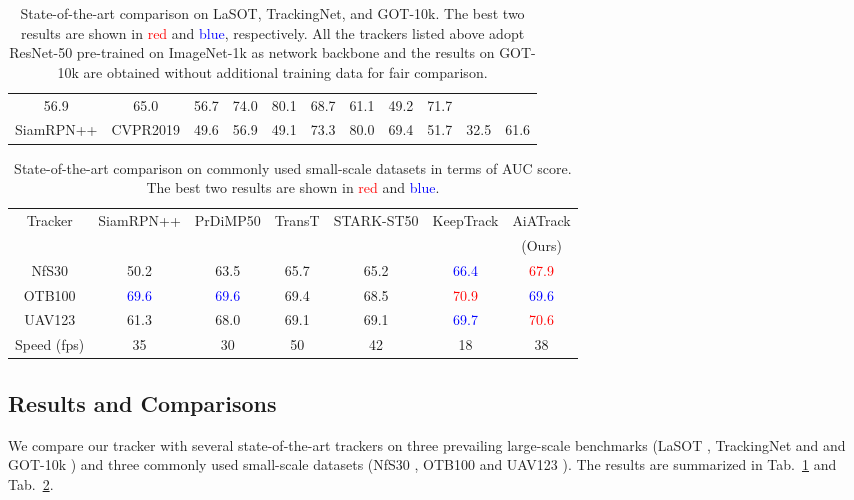 \documentclass[runningheads]{llncs}
\begin{document}
\begin{table}[t]
\begin{tabular}{c|c|ccc|ccc|ccc}
56.9 & 65.0 & 56.7 & 74.0 & 80.1 & 68.7 & 61.1 & 49.2 & 71.7 \\
SiamRPN++ \cite{li2019siamrpn++} & CVPR2019 & 
49.6 & 56.9 & 49.1 & 73.3 & 80.0 & 69.4 & 51.7 & 32.5 & 61.6 \\
\hline
\end{tabular}
\caption{State-of-the-art comparison on LaSOT, TrackingNet, and GOT-10k. The best two results are shown in \textcolor{red}{red} and \textcolor{blue}{blue}, respectively. All the trackers listed above adopt ResNet-50 pre-trained on ImageNet-1k as network backbone and the results on GOT-10k are obtained without additional training data for fair comparison.}
\label{table-large}
\end{table}

\begin{table}[t]
\centering
\begin{tabular}{c|cccccc}
\hline
\multirow{2}{*}{Tracker}
& SiamRPN++ & PrDiMP50 & TransT & STARK-ST50 & KeepTrack & AiATrack \\
& \cite{li2019siamrpn++} & \cite{danelljan2020probabilistic} & \cite{chen2021transformer} & \cite{yan2021learning} & \cite{mayer2021learning} & (Ours) \\
\hline
NfS30 \cite{kiani2017need} & 50.2 & 63.5 & 65.7 & 65.2 & \textcolor{blue}{66.4} & \textcolor{red}{67.9} \\
OTB100 \cite{wu2015object} & \textcolor{blue}{69.6} & \textcolor{blue}{69.6} & 69.4 & 68.5 & \textcolor{red}{70.9} & \textcolor{blue}{69.6} \\
UAV123 \cite{mueller2016benchmark} & 61.3 & 68.0 & 69.1 & 69.1 & \textcolor{blue}{69.7} & \textcolor{red}{70.6} \\
\hline
Speed (fps) & 35 & 30 & 50 & 42 & 18 & 38 \\
\hline
\end{tabular}
\caption{State-of-the-art comparison on commonly used small-scale datasets in terms of AUC score. The best two results are shown in \textcolor{red}{red} and \textcolor{blue}{blue}.}
\label{table-small}
\end{table}

\subsection{Results and Comparisons}\label{section-comparison}
We compare our tracker with several state-of-the-art trackers on three prevailing large-scale benchmarks (LaSOT \cite{fan2019lasot}, TrackingNet and \cite{muller2018trackingnet} and GOT-10k \cite{huang2019got}) and three commonly used small-scale datasets (NfS30 \cite{kiani2017need}, OTB100 \cite{wu2015object} and UAV123 \cite{mueller2016benchmark}). The results are summarized in Tab.~\ref{table-large} and Tab.~\ref{table-small}.
\end{document}
